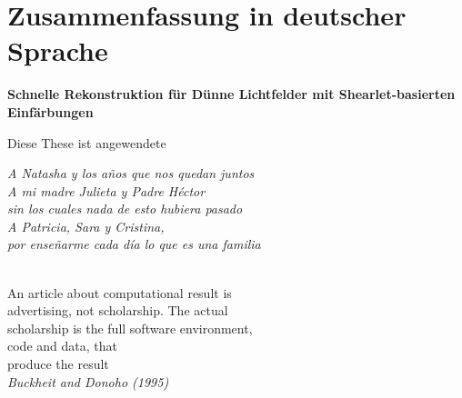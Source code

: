 \documentclass[11pt, english, singlespacing, headsepline, ]{MastersDoctoralThesis}
\theoremstyle{definition}
\begin{document}
 
\clearpage\pagestyle{empty}
\section*{Zusammenfassung in deutscher Sprache}

\begin{center}
\textbf{Schnelle Rekonstruktion für Dünne Lichtfelder mit Shearlet-basierten Einfärbungen}
\end{center}

Diese These ist angewendete

\clearpage\pagestyle{empty}
\begin{flushleft}
\textit{A Natasha y los años que nos quedan juntos\\
A mi madre Julieta y Padre Héctor \\
sin los cuales nada de esto hubiera pasado\\
A Patricia, Sara y Cristina, \\
por enseñarme cada día lo que es una familia}
\end{flushleft}



\cleardoublepage
 $\mbox{}$\\
An article about computational result is \\
advertising, not scholarship. The actual \\
scholarship is the full software environment,\\
code and data, that \\
produce the result
\\

\textit{Buckheit and Donoho (1995)}



\end{document}
